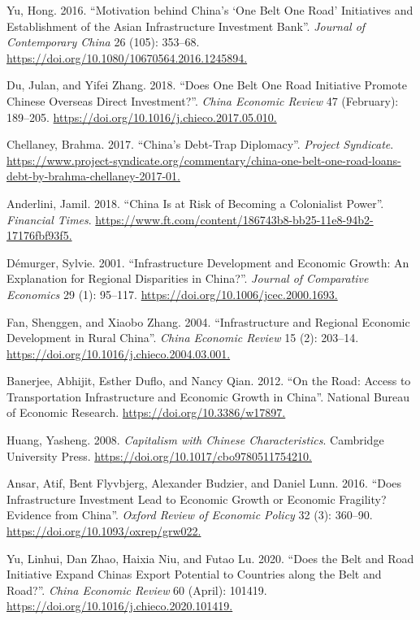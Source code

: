 \documentclass[10pt,a4paper]{article}
\begin{document}
\label{csl:7}Yu, Hong. 2016. ``{Motivation behind China's `One Belt One Road' Initiatives and Establishment of the Asian Infrastructure Investment Bank}''. \textit{Journal of Contemporary China} 26 (105): 353–68. \url{https://doi.org/10.1080/10670564.2016.1245894.}

\label{csl:8}Du, Julan, and Yifei Zhang. 2018. ``{Does One Belt One Road Initiative Promote Chinese Overseas Direct Investment?}''. \textit{China Economic Review} 47 (February): 189–205. \url{https://doi.org/10.1016/j.chieco.2017.05.010.}

\label{csl:9}Chellaney, Brahma. 2017. ``{China’s Debt-Trap Diplomacy}''. \textit{Project Syndicate}. \url{https://www.project-syndicate.org/commentary/china-one-belt-one-road-loans-debt-by-brahma-chellaney-2017-01.}

\label{csl:10}Anderlini, Jamil. 2018. ``{China Is at Risk of Becoming a Colonialist Power}''. \textit{Financial Times}. \url{https://www.ft.com/content/186743b8-bb25-11e8-94b2-17176fbf93f5.}

\label{csl:11}D{\'{e}}murger, Sylvie. 2001. ``{Infrastructure Development and Economic Growth: An Explanation for Regional Disparities in China?}''. \textit{Journal of Comparative Economics} 29 (1): 95–117. \url{https://doi.org/10.1006/jcec.2000.1693.}

\label{csl:12}Fan, Shenggen, and Xiaobo Zhang. 2004. ``{Infrastructure and Regional Economic Development in Rural China}''. \textit{China Economic Review} 15 (2): 203–14. \url{https://doi.org/10.1016/j.chieco.2004.03.001.}

\label{csl:13}Banerjee, Abhijit, Esther Duflo, and Nancy Qian. 2012. ``{On the Road: Access to Transportation Infrastructure and Economic Growth in China}''. National Bureau of Economic Research. \url{https://doi.org/10.3386/w17897.}

\label{csl:14}Huang, Yasheng. 2008. \textit{{Capitalism with Chinese Characteristics}}. Cambridge University Press. \url{https://doi.org/10.1017/cbo9780511754210.}

\label{csl:15}Ansar, Atif, Bent Flyvbjerg, Alexander Budzier, and Daniel Lunn. 2016. ``{Does Infrastructure Investment Lead to Economic Growth or Economic Fragility? Evidence from China}''. \textit{Oxford Review of Economic Policy} 32 (3): 360–90. \url{https://doi.org/10.1093/oxrep/grw022.}

\label{csl:16}Yu, Linhui, Dan Zhao, Haixia Niu, and Futao Lu. 2020. ``{Does the Belt and Road Initiative Expand China{\Textquotesingle}s Export Potential to Countries along the Belt and Road?}''. \textit{China Economic Review} 60 (April): 101419. \url{https://doi.org/10.1016/j.chieco.2020.101419.}
\end{document}
